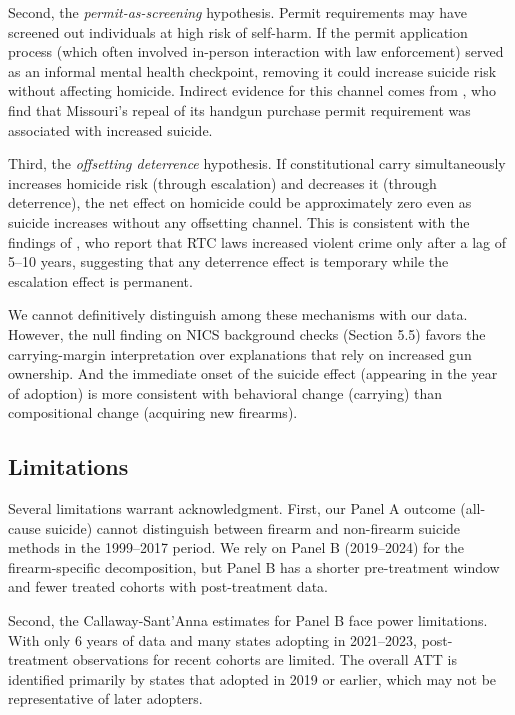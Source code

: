 \documentclass[12pt]{article}
\begin{document}
Second, the \textit{permit-as-screening} hypothesis. Permit requirements may have screened out individuals at high risk of self-harm. If the permit application process (which often involved in-person interaction with law enforcement) served as an informal mental health checkpoint, removing it could increase suicide risk without affecting homicide. Indirect evidence for this channel comes from \citet{crifasi2015effects}, who find that Missouri's repeal of its handgun purchase permit requirement was associated with increased suicide.

Third, the \textit{offsetting deterrence} hypothesis. If constitutional carry simultaneously increases homicide risk (through escalation) and decreases it (through deterrence), the net effect on homicide could be approximately zero even as suicide increases without any offsetting channel. This is consistent with the findings of \citet{donohue2019right}, who report that RTC laws increased violent crime only after a lag of 5--10 years, suggesting that any deterrence effect is temporary while the escalation effect is permanent.

We cannot definitively distinguish among these mechanisms with our data. However, the null finding on NICS background checks (Section 5.5) favors the carrying-margin interpretation over explanations that rely on increased gun ownership. And the immediate onset of the suicide effect (appearing in the year of adoption) is more consistent with behavioral change (carrying) than compositional change (acquiring new firearms).

\subsection{Limitations}

Several limitations warrant acknowledgment. First, our Panel A outcome (all-cause suicide) cannot distinguish between firearm and non-firearm suicide methods in the 1999--2017 period. We rely on Panel B (2019--2024) for the firearm-specific decomposition, but Panel B has a shorter pre-treatment window and fewer treated cohorts with post-treatment data.

Second, the Callaway-Sant'Anna estimates for Panel B face power limitations. With only 6 years of data and many states adopting in 2021--2023, post-treatment observations for recent cohorts are limited. The overall ATT is identified primarily by states that adopted in 2019 or earlier, which may not be representative of later adopters.
\end{document}
